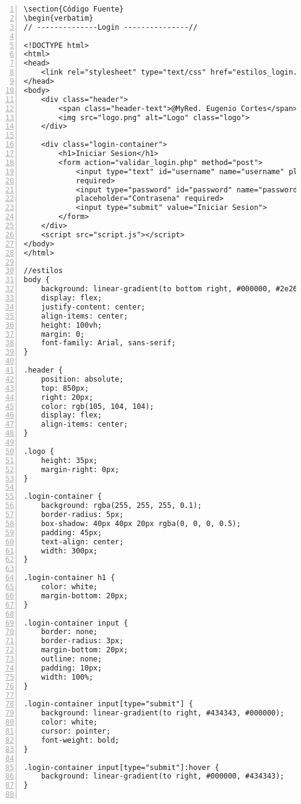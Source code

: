 

\begin{lstlisting}[basicstyle=\footnotesize\ttfamily, numbers=left]
\section{Código Fuente}
\begin{verbatim}
// --------------Login ---------------//

<!DOCTYPE html>
<html>
<head>
    <link rel="stylesheet" type="text/css" href="estilos_login.css">
</head>
<body>
    <div class="header">
        <span class="header-text">@MyRed. Eugenio Cortes</span>
        <img src="logo.png" alt="Logo" class="logo">
    </div>

    <div class="login-container">
        <h1>Iniciar Sesion</h1>
        <form action="validar_login.php" method="post">
            <input type="text" id="username" name="username" placeholder="Usuario" 
            required>
            <input type="password" id="password" name="password" 
            placeholder="Contrasena" required>
            <input type="submit" value="Iniciar Sesion">
        </form>
    </div>
    <script src="script.js"></script>
</body>
</html>

//estilos
body {
    background: linear-gradient(to bottom right, #000000, #2e2626);
    display: flex;
    justify-content: center;
    align-items: center;
    height: 100vh;
    margin: 0;
    font-family: Arial, sans-serif;
}

.header {
    position: absolute;
    top: 850px; 
    right: 20px;
    color: rgb(105, 104, 104); 
    display: flex; 
    align-items: center; 
}

.logo {
    height: 35px;
    margin-right: 0px;
}

.login-container {
    background: rgba(255, 255, 255, 0.1);
    border-radius: 5px;
    box-shadow: 40px 40px 20px rgba(0, 0, 0, 0.5);
    padding: 45px;
    text-align: center;
    width: 300px;
}

.login-container h1 {
    color: white;
    margin-bottom: 20px;
}

.login-container input {
    border: none;
    border-radius: 3px;
    margin-bottom: 20px;
    outline: none;
    padding: 10px;
    width: 100%;
}

.login-container input[type="submit"] {
    background: linear-gradient(to right, #434343, #000000);
    color: white;
    cursor: pointer;
    font-weight: bold;
}

.login-container input[type="submit"]:hover {
    background: linear-gradient(to right, #000000, #434343);
}


\end{lstlisting}
